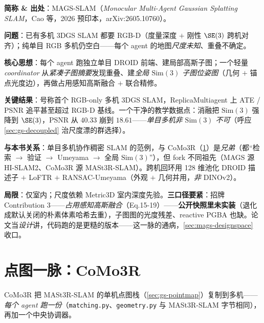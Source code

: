 \begin{paper}
\textbf{简称 \& 出处}：MAGS-SLAM（\emph{Monocular Multi-Agent Gaussian Splatting SLAM}，Cao 等，2026 预印本，arXiv:2605.10760）\cite{cao2026magsslam}。

\textbf{问题}：已有多机 3DGS SLAM 都要 RGB-D（度量深度 $+$ 刚性 $\SE(3)$ 跨机对齐）；纯单目 RGB 多机仍空白——每个 agent 的地图\emph{尺度未知}、重叠不确定。

\textbf{核心思想}：每个 agent 跑独立单目 DROID 前端、建局部高斯子图；一个轻量 \emph{coordinator} 从\emph{紧凑子图摘要}发现重叠、建\emph{全局 $\mathrm{Sim}(3)$ 子图位姿图}（几何 $+$ 锚点光度边），再做占用感知高斯融合 $+$ 联合精修。

\textbf{关键结果}：号称首个 RGB-only 多机 3DGS SLAM，ReplicaMultiagent 上 ATE / PSNR 追平甚至超过 RGB-D 基线。一个干净的教学数据点：消融把 $\mathrm{Sim}(3)$ 强降到 $\SE(3)$，PSNR 从 $40.33$ 崩到 $18.61$——\emph{单目多机非 $\mathrm{Sim}(3)$ 不可}（呼应 \cref{sec:gs-decoupled} 治尺度漂的群选择）。

\textbf{与本书关系}：单目多机协作稠密 SLAM 的范例，与 CoMo3R（\cref{sec:mags-pointmap}）是\emph{兄弟}（都“检索 $\to$ 验证 $\to$ Umeyama $\to$ 全局 $\mathrm{Sim}(3)$”），但 fork 不同祖先（MAGS 源 HI-SLAM2、CoMo3R 源 MASt3R-SLAM）。跨机回环用 128 维池化 DROID 描述子 $+$ LoFTR $+$ RANSAC-Umeyama（外观 $+$ 几何并用，\emph{非} DINOv2）。

\textbf{局限}：仅室内；尺度依赖 Metric3D 室内深度先验。\textbf{三口径要紧}：招牌 Contribution 3——\emph{占用感知高斯融合}（Eq.15-19）——\textbf{公开快照里未实装}（退化成默认关闭的朴素体素哈希去重），子图图的光度残差、reactive PGBA 也缺。论文当\emph{设计}讲，代码跑的是更糙的版本——这一脉的通病，\cref{sec:mags-designspace} 收口。
\end{paper}

\section{点图一脉：CoMo3R}
\label{sec:mags-pointmap}

CoMo3R 把 MASt3R-SLAM 的单机点图栈（\cref{sec:gs-pointmap}）复制到多机——\emph{每个 agent 跑一份}（\texttt{matching.py}、\texttt{geometry.py} 与 MASt3R-SLAM 字节相同），再加一个中央协调器。


